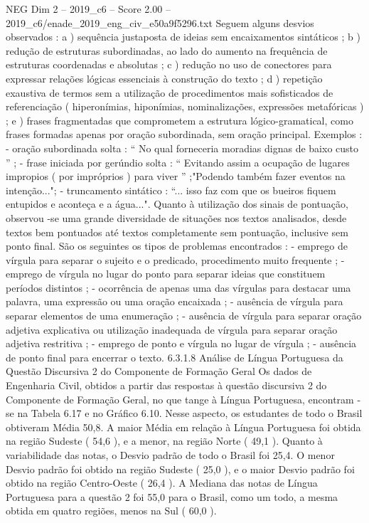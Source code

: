 \begin{textsample}{NEG Dim 2 – 2019\_c6 – Score 2.00 – 2019\_c6/enade\_2019\_eng\_civ\_e50a9f5296.txt}
Seguem alguns desvios observados : a ) sequência justaposta de ideias sem encaixamentos sintáticos ; b ) redução de estruturas subordinadas, ao lado do aumento na frequência de estruturas coordenadas e absolutas ; c ) redução no uso de conectores para expressar relações lógicas essenciais à construção do texto ; d ) repetição exaustiva de termos sem a utilização de procedimentos mais sofisticados de referenciação ( hiperonímias, hiponímias, nominalizações, expressões metafóricas ) ; e ) frases fragmentadas que comprometem a estrutura lógico-gramatical, como frases formadas apenas por oração subordinada, sem oração principal.
Exemplos : - oração subordinada solta : “ No qual forneceria moradias dignas de baixo custo ” ; - frase iniciada por gerúndio solta : “ Evitando assim a ocupação de lugares impropios ( por impróprios ) para viver ” ;"Podendo também fazer eventos na intenção..."; - truncamento sintático : “... isso faz com que os bueiros fiquem entupidos e aconteça e a água...".
Quanto à utilização dos sinais de pontuação, observou -se uma grande diversidade de situações nos textos analisados, desde textos bem pontuados até textos completamente sem pontuação, inclusive sem ponto final.
São os seguintes os tipos de problemas encontrados : - emprego de vírgula para separar o sujeito e o predicado, procedimento muito frequente ; - emprego de vírgula no lugar do ponto para separar ideias que constituem períodos distintos ; - ocorrência de apenas uma das vírgulas para destacar uma palavra, uma expressão ou uma oração encaixada ; - ausência de vírgula para separar elementos de uma enumeração ; - ausência de vírgula para separar oração adjetiva explicativa ou utilização inadequada de vírgula para separar oração adjetiva restritiva ; - emprego de ponto e vírgula no lugar de vírgula ; - ausência de ponto final para encerrar o texto. 6.3.1.8 Análise de Língua Portuguesa da Questão Discursiva 2 do Componente de Formação Geral Os dados de Engenharia Civil, obtidos a partir das respostas à questão discursiva 2 do Componente de Formação Geral, no que tange à Língua Portuguesa, encontram -se na Tabela 6.17 e no Gráfico 6.10.
Nesse aspecto, os estudantes de todo o Brasil obtiveram Média 50,8.
A maior Média em relação à Língua Portuguesa foi obtida na região Sudeste ( 54,6 ), e a menor, na região Norte ( 49,1 ).
Quanto à variabilidade das notas, o Desvio padrão de todo o Brasil foi 25,4.
O menor Desvio padrão foi obtido na região Sudeste ( 25,0 ), e o maior Desvio padrão foi obtido na região Centro-Oeste ( 26,4 ).
A Mediana das notas de Língua Portuguesa para a questão 2 foi 55,0 para o Brasil, como um todo, a mesma obtida em quatro regiões, menos na Sul ( 60,0 ).

\end{textsample}

